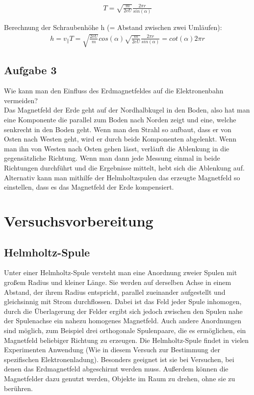 \documentclass[a4paper,10pt]{scrartcl}
\begin{document}
	
	
	\begin{align}
	T=\sqrt{\frac{m}{2eU}}\frac{2\pi r}{sin(\alpha)}
	\end{align}
	
	\newpage
	
	Berechnung der Schraubenhöhe h (= Abstand zwischen zwei Umläufen):
	\begin{align}
	h=v_{\parallel}T=\sqrt{\frac{2eU}{m}}cos(\alpha)\sqrt{\frac{m}{2eU}}\frac{2\pi r}{sin(\alpha)}=cot(\alpha)2\pi r
	\end{align}
	
	\subsection{Aufgabe 3}
	
	Wie kann man den Einfluss des Erdmagnetfeldes auf die Elektronenbahn vermeiden?\\
	Das Magnetfeld der Erde geht auf der Nordhalbkugel in den Boden, also hat man eine Komponente die parallel zum Boden nach Norden zeigt und eine, welche senkrecht in den Boden geht. Wenn man den Strahl so aufbaut, dass er von Osten nach Westen geht, wird er durch beide Komponenten abgelenkt. Wenn man ihn von Westen nach Osten gehen lässt, verläuft die Ablenkung in die gegensätzliche Richtung. Wenn man dann jede Messung einmal in beide Richtungen durchführt und die Ergebnisse mittelt, hebt sich die Ablenkung auf.\\
	Alternativ kann man mithilfe der Helmholtzspulen das erzeugte Magnetfeld so einstellen, dass es das Magnetfeld der Erde kompensiert.
	\newpage
	\section{Versuchsvorbereitung}
	\subsection{Helmholtz-Spule}
	Unter einer Helmholtz-Spule versteht man eine Anordnung zweier Spulen mit großem Radius und kleiner Länge. Sie werden auf derselben Achse in einem Abstand, der ihrem Radius entspricht, parallel zueinander aufgestellt und gleichsinnig mit Strom durchflossen.
	Dabei ist das Feld jeder Spule inhomogen, durch die Überlagerung der Felder ergibt sich jedoch zwischen den Spulen nahe der Spulenachse ein nahezu homogenes Magnetfeld.
	Auch andere Anordnungen sind möglich, zum Beispiel drei orthogonale Spulenpaare, die es ermöglichen, ein Magnetfeld beliebiger Richtung zu erzeugen. Die Helmholtz-Spule findet in vielen Experimenten Anwendung (Wie in diesem Versuch zur Bestimmung der spezifischen Elektronenladung). Besonders geeignet ist sie bei Versuchen, bei denen das Erdmagnetfeld abgeschirmt werden muss. Außerdem können die Magnetfelder dazu genutzt werden, Objekte im Raum zu drehen, ohne sie zu berühren.
\end{document}
